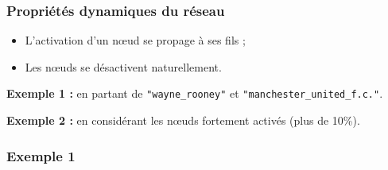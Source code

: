\documentclass[12pt, handout]{beamer}
\begin{document}
\begin{frame}[fragile]
 \frametitle{Propriétés dynamiques du réseau}
 
 \begin{itemize}
  \item  L'activation d'un n\oe ud se propage à ses fils ;
  \item Les n\oe uds se désactivent naturellement.
 \end{itemize}
 
 \textbf{Exemple 1 :} en partant de \verb|"wayne_rooney"| et  \verb|"manchester_united_f.c."|.
 
 \textbf{Exemple 2 :} en considérant les n\oe uds fortement activés (plus de 10\%).
 
 
\end{frame}


\begin{frame}
  \frametitle{Exemple 1}
% 
%   

\end{frame}
\end{document}
